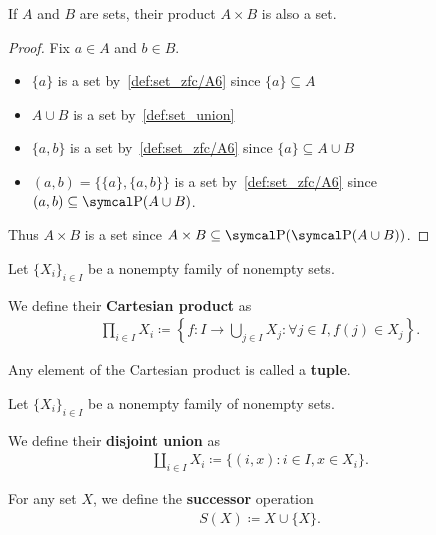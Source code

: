 \begin{proposition}\label{def:binary_cartesian_product_is_set}
  If \( A \) and \( B \) are sets, their product \( A \times B \) is also a set.
\end{proposition}
\begin{proof}
  Fix \( a \in A \) and \( b \in B \).
  \begin{itemize}
    \item \( \{ a \} \) is a set by~\ref{def:set_zfc/A6} since \( \{ a \} \subseteq A \)
    \item \( A \cup B \) is a set by~\cref{def:set_union}
    \item \( \{ a, b \} \) is a set by~\ref{def:set_zfc/A6} since \( \{ a \} \subseteq A \cup B \)
    \item \( (a, b) = \{ \{ a \}, \{ a, b \} \} \) is a set by~\ref{def:set_zfc/A6} since \( (a, b) \subseteq \Power(A \cup B) \).
  \end{itemize}

  Thus \( A \times B \) is a set since \( A \times B \subseteq \Power(\Power(A \cup B)) \).
\end{proof}

\begin{definition}\label{def:cartesian_product}\cite[54]{Enderton1977}
  Let \( \{ X_i \}_{i \in I} \) be a nonempty family of nonempty sets.

  We define their \textbf{Cartesian product} as
  \begin{align*}
    \prod_{i \in I} X_i \coloneqq \left\{ f: I \to \bigcup_{j \in I} X_j \colon \forall j \in I, f(j) \in X_j \right\}.
  \end{align*}

  Any element of the Cartesian product is called a \textbf{tuple}.
\end{definition}

\begin{definition}\label{def:disjoint_union}
  Let \( \{ X_i \}_{i \in I} \) be a nonempty family of nonempty sets.

  We define their \textbf{disjoint union} as
  \begin{align*}
    \coprod_{i \in I} X_i \coloneqq \{ (i, x) \colon i \in I, x \in X_i \}.
  \end{align*}
\end{definition}

\begin{definition}\label{def:successor_operator}\cite[68]{Enderton1977}
  For any set \( X \), we define the \textbf{successor} operation
  \begin{align*}
    S(X) \coloneqq X \cup \{ X \}.
  \end{align*}
\end{definition}

